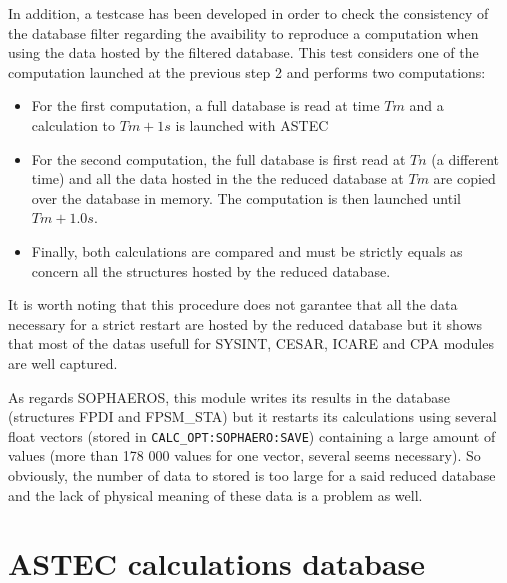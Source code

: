 In addition, a testcase has been developed in order to check the consistency of the database filter regarding the avaibility to reproduce a computation when using the data hosted 
by the filtered database.
This test considers one of the computation launched at the previous step 2 and performs two computations:
\begin{itemize}
\item For the first computation, a full database is read at time $Tm$ and a calculation to $Tm + 1 s$ is launched with ASTEC 
\item For the second computation, the full database is first read at $Tn$ (a different time) and all the data hosted in the the reduced database at $Tm$ are copied
over the database in memory. The computation is then launched until $Tm + 1.0 s$.
\item Finally, both calculations are compared and must be strictly equals as concern all the structures hosted by the reduced database.
\end{itemize}

It is worth noting that this procedure does not garantee that all the data necessary for a strict restart are hosted by the reduced database but it shows
that most of the datas usefull for SYSINT, CESAR, ICARE and CPA modules are well captured.

As regards SOPHAEROS, this module writes its results in the database (structures FPDI and FPSM_STA) but it restarts its calculations using
 several float vectors (stored in \verb+CALC_OPT:SOPHAERO:SAVE+) containing a large amount of values (more than 178 000 values for one vector, several seems necessary). So obviously, the 
 number of data to stored is too large for a said reduced database and the lack of physical meaning of these data is a problem as well. 

\section{ASTEC calculations database}

